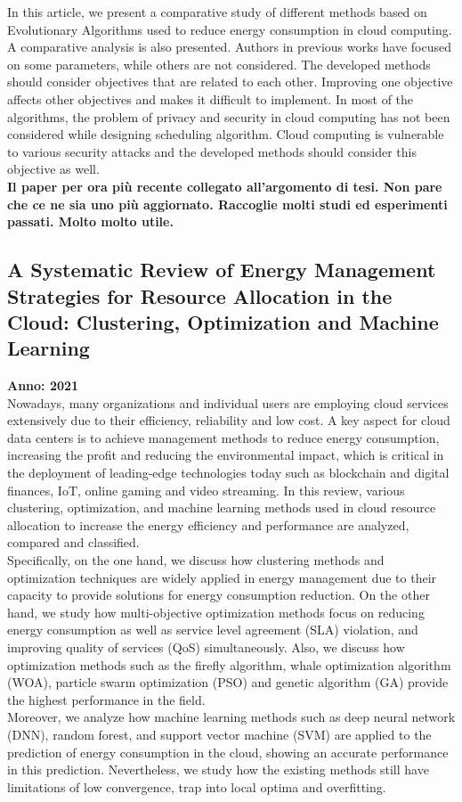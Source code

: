 In this article, we present a comparative study of different
methods based on Evolutionary Algorithms used to reduce energy consumption in cloud computing. 
A comparative analysis is also presented. Authors in previous works have focused
on some parameters, while others are not considered. 
The developed methods should consider objectives that are related
to each other. Improving one objective affects other objectives and makes it difficult to implement. 
In most of the algorithms, the problem of privacy and security in cloud computing has not
been considered while designing scheduling algorithm. 
Cloud computing is vulnerable to various security attacks and the
developed methods should consider this objective as well.\\

\textbf{Il paper per ora più recente collegato all'argomento di tesi. Non pare che ce ne sia uno più aggiornato. Raccoglie molti studi ed esperimenti passati. Molto molto utile.}


\subsection{A Systematic Review of Energy Management Strategies for Resource Allocation in the Cloud: Clustering, Optimization and Machine Learning}
\textbf{Anno: 2021}~\cite{jayaprakash2021systematic}\\
Nowadays, many organizations and individual users are employing cloud services extensively due to their efficiency, reliability and low cost. 
A key aspect for cloud data centers is to achieve management methods to reduce energy consumption, increasing the profit and reducing the environmental impact, which is critical
in the deployment of leading-edge technologies today such as blockchain and digital finances, IoT, online gaming and video streaming. 
In this review, various clustering, optimization, and machine learning methods used in cloud resource allocation to increase the energy efficiency and performance are analyzed, 
compared and classified. \\
Specifically, on the one hand, we discuss how clustering methods and optimization techniques are widely applied in energy management due to their capacity to provide solutions 
for energy consumption reduction. On the other hand, we study how multi-objective optimization methods focus on reducing energy consumption as well as service level agreement 
(SLA) violation, and improving quality of services (QoS) simultaneously. 
Also, we discuss how optimization methods such as the firefly algorithm, whale optimization algorithm (WOA), particle swarm optimization (PSO) and genetic algorithm (GA) 
provide the highest performance in the field. \\
Moreover, we analyze how machine learning methods such as deep neural network (DNN), random forest, and support vector machine (SVM) 
are applied to the prediction of energy consumption in the cloud, showing an accurate performance in this prediction. 
Nevertheless, we study how the existing methods still have limitations of low convergence, trap into local optima and overfitting. \\

